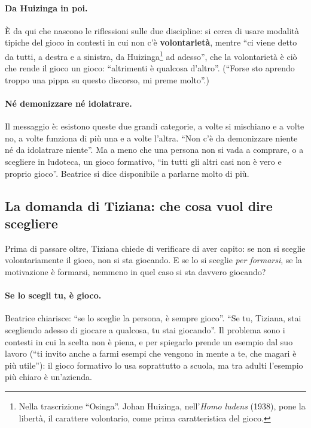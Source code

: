 \paragraph{Da Huizinga in poi.} È da qui che nascono le riflessioni sulle due
discipline: si cerca di usare modalità tipiche del gioco in contesti in cui non c'è
\textbf{volontarietà}, mentre ``ci viene detto da tutti, a destra e a sinistra, da
Huizinga\footnote{Nella trascrizione ``Osinga''. Johan Huizinga, nell'\emph{Homo
ludens} (1938), pone la libertà, il carattere volontario, come prima caratteristica
del gioco.} ad adesso'', che la volontarietà è ciò che rende il gioco un gioco:
``altrimenti è qualcosa d'altro''. (``Forse sto aprendo troppo una pippa su questo
discorso, mi preme molto''.)

\paragraph{Né demonizzare né idolatrare.} Il messaggio è: esistono queste due grandi
categorie, a volte si mischiano e a volte no, a volte funziona di più una e a volte
l'altra. ``Non c'è da demonizzare niente né da idolatrare niente''. Ma a meno che una
persona non si vada a comprare, o a scegliere in ludoteca, un gioco formativo, ``in
tutti gli altri casi non è vero e proprio gioco''. Beatrice si dice disponibile a
parlarne molto di più.

\subsection{La domanda di Tiziana: che cosa vuol dire scegliere}
\label{a9:sec:tiziana}

Prima di passare oltre, Tiziana chiede di verificare di aver capito: se non si sceglie
volontariamente il gioco, non si sta giocando. E se lo si sceglie \emph{per formarsi},
se la motivazione è formarsi, nemmeno in quel caso si sta davvero giocando?

\paragraph{Se lo scegli tu, è gioco.} Beatrice chiarisce: ``se lo sceglie la persona, è
sempre gioco''. ``Se tu, Tiziana, stai scegliendo adesso di giocare a qualcosa, tu stai
giocando''. Il problema sono i contesti in cui la scelta non è piena, e per spiegarlo
prende un esempio dal suo lavoro (``ti invito anche a farmi esempi che vengono in mente
a te, che magari è più utile''): il gioco formativo lo usa soprattutto a scuola, ma
tra adulti l'esempio più chiaro è un'azienda.

